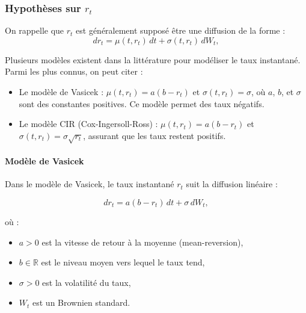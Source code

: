 \subsubsection{Hypothèses sur $r_t$}

On rappelle que $r_t$ est généralement supposé être une diffusion de la forme :
\begin{equation}
    dr_t = \mu(t,r_t)\,dt + \sigma(t,r_t)\,dW_t,
    \label{eq:diffusion_rt}
\end{equation}

Plusieurs modèles existent dans la littérature pour modéliser le taux instantané. Parmi les plus connus, on peut citer :
\begin{itemize}
    \item Le modèle de Vasicek : $\mu(t,r_t) = a(b - r_t)$ et $\sigma(t,r_t) = \sigma$, où $a$, $b$, et $\sigma$ sont des constantes positives. Ce modèle permet des taux négatifs.
    \item Le modèle CIR (Cox-Ingersoll-Ross) : $\mu(t,r_t) = a(b - r_t)$ et $\sigma(t,r_t) = \sigma \sqrt{r_t}$, assurant que les taux restent positifs.
\end{itemize}

\paragraph{Modèle de Vasicek}

Dans le modèle de Vasicek, le taux instantané $r_t$ suit la diffusion linéaire :

\begin{equation}
    dr_t = a (b - r_t) \, dt + \sigma \, dW_t,
    \label{eq:vasicek}
\end{equation}

où :
\begin{itemize}
    \item $a > 0$ est la vitesse de retour à la moyenne (mean-reversion),
    \item $b \in \mathbb{R}$ est le niveau moyen vers lequel le taux tend,
    \item $\sigma > 0$ est la volatilité du taux,
    \item $W_t$ est un Brownien standard.
\end{itemize}

\vspace{0.5cm}

